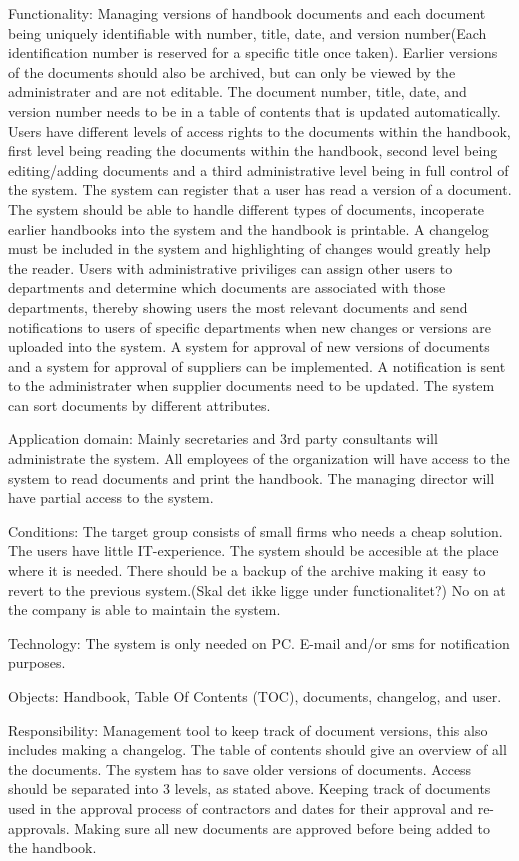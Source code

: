 Functionality: Managing versions of handbook documents and each document being uniquely identifiable with number, title, date, and version number(Each identification number is reserved for a specific title once taken). Earlier versions of the documents should also be archived, but can only be viewed by the administrater and are not editable.
The document number, title, date, and version number needs to be in a table of contents that is updated automatically.
Users have different levels of access rights to the documents within the handbook, first level being reading the documents within the handbook, second level being editing/adding documents and a third administrative level being in full control of the system.
The system can register that a user has read a version of a document.
The system should be able to handle different types of documents, incoperate earlier handbooks into the system and the handbook is printable.
A changelog must be included in the system and highlighting of changes would greatly help the reader.
Users with administrative priviliges can assign other users to departments and determine which documents are associated with those departments, thereby showing users the most relevant documents and send notifications to users of specific departments when new changes or versions are uploaded into the system.
A system for approval of new versions of documents and a system for approval of suppliers can be implemented. 
A notification is sent to the administrater when supplier documents need to be updated. The system can sort documents by different attributes.

Application domain: Mainly secretaries and 3rd party consultants will administrate the system. All employees of the organization will have access to the system to read documents and print the handbook. The managing director will have partial access to the system.

Conditions: The target group consists of small firms who needs a cheap 
solution. The users have little IT-experience. The system should be accesible at the place where it is needed.
There should be a backup of the archive making it easy to revert to the previous system.(Skal det ikke ligge under functionalitet?)
No on at the company is able to maintain the system.

Technology: The system is only needed on PC. E-mail and/or sms for notification purposes.

Objects: Handbook, Table Of Contents (TOC), documents, changelog, and user.

Responsibility: Management tool to keep track of document versions, this also includes making a changelog. The table of contents should give an overview of all the documents. The system has to save older versions of documents. Access should be separated into 3 levels, as stated above. Keeping track of documents used in the approval process of contractors and dates for their approval and re-approvals. Making sure all new documents are approved before being added to the handbook.